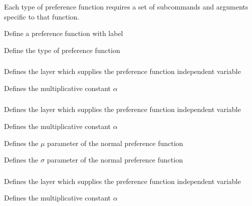 Each type of preference function requires a set of subcommands and arguments specific to that function.

 {Define a preference function with label}

 {Define the type of preference function}

\subsubsection[Constant]{}

 {Defines the layer which supplies the preference function independent variable}

 {Defines the multiplicative constant $\alpha$}

\subsubsection[Normal]{}

 {Defines the layer which supplies the preference function independent variable}

 {Defines the multiplicative constant $\alpha$}

 {Defines the $\mu$ parameter of the normal preference function}

 {Defines the $\sigma$ parameter of the normal preference function}

\subsubsection[Double-normal]{}

 {Defines the layer which supplies the preference function independent variable}

 {Defines the multiplicative constant $\alpha$}


